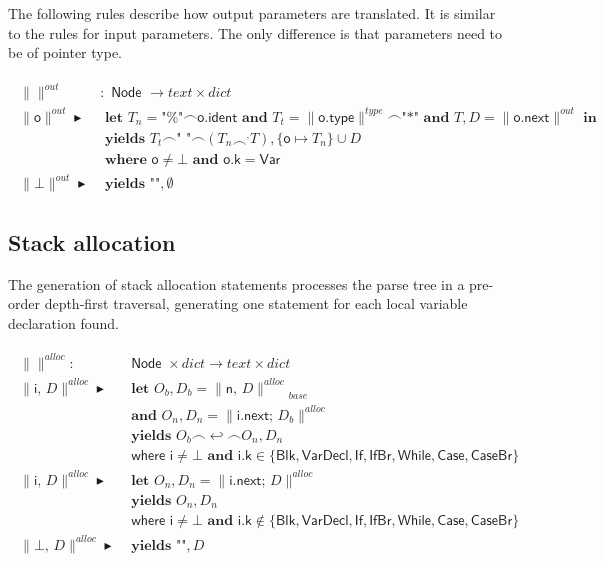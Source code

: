 \documentclass{article}
\newcommand{\trad}[2]{\ensuremath{\lVert \textsf{#1} \rVert^{\textit{#2}}}}
\newcommand{\nl}[0]{\ensuremath{\hookleftarrow}}
\newcommand{\mty}[0]{\texttt{""}}
\DeclareMathOperator{\conc}{\smallfrown}
\DeclareMathOperator{\isdef}{\blacktriangleright}
\begin{document}
The following rules describe how output parameters are translated. It
is similar to the rules for input parameters. The only difference is
that parameters need to be of pointer type.

\begin{framed}
  \begin{align}
\begin{split}
    \trad{}{out} &: \textsf{ Node } \rightarrow text \times dict \\
    \trad{o}{out} \isdef& \textbf{ let } T_n = \textsf{"\%"} \conc \textsf{o.ident} 
    \textbf{ and } T_t = \trad{o.type}{type} \conc \texttt{"*"}
    \textbf{ and } T, D = \trad{o.next}{out} \textbf{ in}  \\
    & \textbf{ yields } T_t \conc \texttt{" "} \conc (T_n \conc^, T), \{ \textsf{o} \mapsto T_n \} \cup D  \\
    & \textbf{ where } \textsf{o} \ne \bot \textbf{ and } \textsf{o.k} = \textsf{Var}  \\
    \trad{$\bot$}{out} \isdef& \textbf{ yields } \mty, \emptyset  
  \end{split}
\end{align}
\end{framed}

\subsection{Stack allocation}
\label{sec:trad-alloc}

The generation of stack allocation statements processes the parse tree
in a pre-order depth-first traversal, generating one statement for
each local variable declaration found. 

\begin{framed}
  \begin{align}
\begin{split}
    \trad{}{alloc} : & \textsf{ Node } \times dict \rightarrow text \times dict \\
    \trad{i, $D$}{alloc} \isdef 
    & \textbf{ let } O_b, D_b = \trad{n, $D$}{alloc}_{base}  \\
    & \textbf{ and } O_n, D_n = \trad{i.next; $D_b$}{alloc}  \\
    & \textbf{ yields } O_b \conc \nl \conc O_n, D_n  \\
    & \textsf{ where } \textsf{i} \ne \bot \textbf{ and } \textsf{i.k} \in \{\textsf{Blk}, \textsf{VarDecl}, \textsf{If}, \textsf{IfBr}, \textsf{While}, \textsf{Case}, \textsf{CaseBr} \}  \\
    \trad{i, $D$}{alloc} \isdef 
    & \textbf{ let } O_n, D_n = \trad{i.next; $D$}{alloc}  \\
    & \textbf{ yields } O_n, D_n  \\
    & \textsf{ where } \textsf{i} \ne \bot \textbf{ and } \textsf{i.k} \not\in \{\textsf{Blk}, \textsf{VarDecl}, \textsf{If}, \textsf{IfBr}, \textsf{While}, \textsf{Case}, \textsf{CaseBr} \}  \\
    \trad{$\bot$, $D$}{alloc} \isdef & \textbf{ yields } \mty, D 
  \end{split}
\end{align}
\end{framed}
\end{document}
